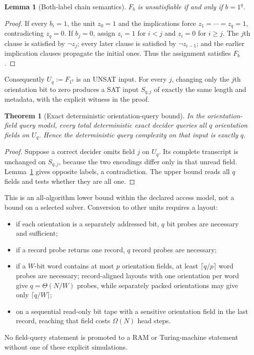 \documentclass[11pt]{article}
\newtheorem{theorem}{Theorem}
\newtheorem{lemma}{Lemma}
\begin{document}
\begin{lemma}[Both-label chain semantics]\label{lem:semantics}
$F_b$ is unsatisfiable if and only if $b=1^q$.
\end{lemma}
\begin{proof}
If every $b_i=1$, the unit $z_0=1$ and the implications force
$z_1=\cdots=z_q=1$, contradicting $z_q=0$.  If $b_j=0$, assign
$z_i=1$ for $i<j$ and $z_i=0$ for $i\geq j$.  The $j$th clause is satisfied
by $\neg z_j$; every later clause is satisfied by $\neg z_{i-1}$; and the
earlier implication clauses propagate the initial ones.  Thus the assignment
satisfies $F_b$.
\end{proof}

Consequently $U_q:=F_{1^q}$ is an UNSAT input.  For every $j$, changing only
the $j$th orientation bit to zero produces a SAT input $S_{q,j}$ of exactly the
same length and metadata, with the explicit witness in the proof.

\begin{theorem}[Exact deterministic orientation-query bound]\label{thm:chain}
In the orientation-field query model, every total deterministic exact decider
queries all $q$ orientation fields on $U_q$.  Hence the deterministic query
complexity on that input is exactly $q$.
\end{theorem}
\begin{proof}
Suppose a correct decider omits field $j$ on $U_q$.  Its complete transcript is
unchanged on $S_{q,j}$, because the two encodings differ only in that unread
field.  Lemma~\ref{lem:semantics} gives opposite labels, a contradiction.  The
upper bound reads all $q$ fields and tests whether they are all one.
\end{proof}

This is an all-algorithm lower bound within the declared access model, not a
bound on a selected solver.  Conversion to other units requires a layout:
\begin{itemize}
\item if each orientation is a separately addressed bit, $q$ bit probes are
necessary and sufficient;
\item if a record probe returns one record, $q$ record probes are necessary;
\item if a $W$-bit word contains at most $p$ orientation fields, at least
$\lceil q/p\rceil$ word probes are necessary; record-aligned layouts with one
orientation per word give $q=\Theta(N/W)$ probes, while separately packed
orientations may give only $\lceil q/W\rceil$;
\item on a sequential read-only bit tape with a sensitive orientation field in
the last record, reaching that field costs $\Omega(N)$ head steps.
\end{itemize}
No field-query statement is promoted to a RAM or Turing-machine statement
without one of these explicit simulations.
\end{document}
